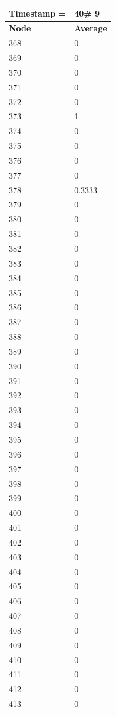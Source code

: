 \begin{tabular}{|l||l|}
\hline
\textbf{Timestamp =} & \textbf{40}\# 9\\\hline
	\textbf{Node} & \textbf{Average} \\ \hline
\hline
	368 & 0 \\ \hline
	369 & 0 \\ \hline
	370 & 0 \\ \hline
	371 & 0 \\ \hline
	372 & 0 \\ \hline
	373 & 1 \\ \hline
	374 & 0 \\ \hline
	375 & 0 \\ \hline
	376 & 0 \\ \hline
	377 & 0 \\ \hline
	378 & 0.3333 \\ \hline
	379 & 0 \\ \hline
	380 & 0 \\ \hline
	381 & 0 \\ \hline
	382 & 0 \\ \hline
	383 & 0 \\ \hline
	384 & 0 \\ \hline
	385 & 0 \\ \hline
	386 & 0 \\ \hline
	387 & 0 \\ \hline
	388 & 0 \\ \hline
	389 & 0 \\ \hline
	390 & 0 \\ \hline
	391 & 0 \\ \hline
	392 & 0 \\ \hline
	393 & 0 \\ \hline
	394 & 0 \\ \hline
	395 & 0 \\ \hline
	396 & 0 \\ \hline
	397 & 0 \\ \hline
	398 & 0 \\ \hline
	399 & 0 \\ \hline
	400 & 0 \\ \hline
	401 & 0 \\ \hline
	402 & 0 \\ \hline
	403 & 0 \\ \hline
	404 & 0 \\ \hline
	405 & 0 \\ \hline
	406 & 0 \\ \hline
	407 & 0 \\ \hline
	408 & 0 \\ \hline
	409 & 0 \\ \hline
	410 & 0 \\ \hline
	411 & 0 \\ \hline
	412 & 0 \\ \hline
	413 & 0 \\ \hline
\end{tabular}

